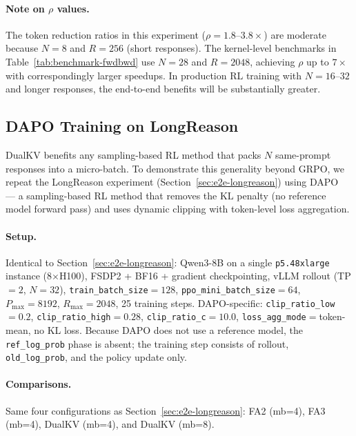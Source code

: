 \documentclass{article}
\begin{document}
\paragraph{Note on $\rho$ values.} The token reduction ratios in this experiment ($\rho = 1.8$--$3.8\times$) are moderate because $N{=}8$ and $R{=}256$ (short responses). The kernel-level benchmarks in Table~\ref{tab:benchmark-fwdbwd} use $N{=}28$ and $R{=}2048$, achieving $\rho$ up to $7\times$ with correspondingly larger speedups. In production RL training with $N{=}16$--$32$ and longer responses, the end-to-end benefits will be substantially greater.

\subsection{DAPO Training on LongReason}
\label{app:dapo-longreason}

DualKV benefits any sampling-based RL method that packs $N$ same-prompt responses into a micro-batch. To demonstrate this generality beyond GRPO, we repeat the LongReason experiment (Section~\ref{sec:e2e-longreason}) using DAPO~\citep{yu2025dapo} --- a sampling-based RL method that removes the KL penalty (no reference model forward pass) and uses dynamic clipping with token-level loss aggregation.

\paragraph{Setup.} Identical to Section~\ref{sec:e2e-longreason}: Qwen3-8B on a single \texttt{p5.48xlarge} instance (8$\times$H100), FSDP2 + BF16 + gradient checkpointing, vLLM rollout (TP${=}2$, $N{=}32$), \texttt{train\_batch\_size}${=}128$, \texttt{ppo\_mini\_batch\_size}${=}64$, $P_{\max}{=}8192$, $R_{\max}{=}2048$, 25 training steps. DAPO-specific: \texttt{clip\_ratio\_low}${=}0.2$, \texttt{clip\_ratio\_high}${=}0.28$, \texttt{clip\_ratio\_c}${=}10.0$, \texttt{loss\_agg\_mode}${=}$token-mean, no KL loss. Because DAPO does not use a reference model, the \texttt{ref\_log\_prob} phase is absent; the training step consists of rollout, \texttt{old\_log\_prob}, and the policy update only.

\paragraph{Comparisons.} Same four configurations as Section~\ref{sec:e2e-longreason}: FA2 (mb=4), FA3 (mb=4), DualKV (mb=4), and DualKV (mb=8).
\end{document}
